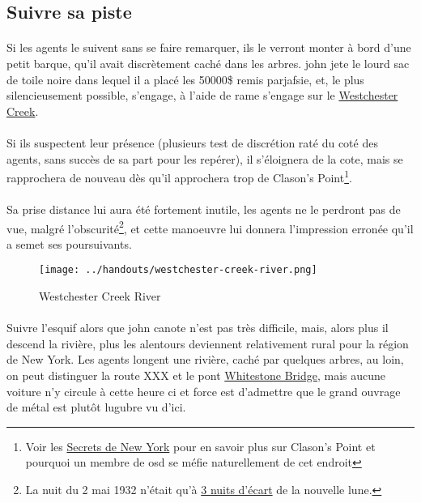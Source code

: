 \subsection{Suivre sa piste}

\paragraph{} Si les agents le suivent sans se faire remarquer, ils le verront monter à bord d'une petit barque, qu'il avait discrètement caché dans les 
arbres. \gls{john} jete le lourd sac de toile noire dans lequel il a placé les 50000\$ remis par\gls{jafsie}, et, le plus silencieusement possible, 
s'engage, à l'aide de rame s'engage sur le \href{http://en.wikipedia.org/wiki/Westchester\_Creek}{Westchester Creek}.

\paragraph{} Si ils suspectent leur présence (plusieurs test de discrétion raté du coté des agents, sans succès de sa part pour les repérer), il 
s'éloignera de la cote, mais se rapprochera de nouveau dès qu'il approchera trop de Clason's Point\footnote{Voir les 
\href{http://www.tentacules.net/index.php?id=1180}{Secrets de New York} pour en savoir plus sur Clason's Point et pourquoi un membre de \gls{osd}
se méfie naturellement de cet endroit}. 

\paragraph{} Sa prise distance lui aura été fortement inutile, les agents ne le perdront pas de vue, malgré l'obscurité\footnote{La nuit du 2 mai 1932 n'était 
qu'à \href{www.moonconnection.com/moon_phases_calendar.phtml}{3 nuits d'écart} de la nouvelle lune.}, et cette manoeuvre lui donnera l'impression erronée
qu'il a semet ses poursuivants.


\begin{wrapfigure}{r}{60mm}
\begin{center}
 \texttt{[image: ../handouts/westchester-creek-river.png]}
\end{center}
\caption{Westchester Creek River}
\end{wrapfigure}



\paragraph{} Suivre l'esquif alors que \gls{john} canote n'est pas très difficile, mais, alors plus il descend la rivière, plus les alentours deviennent 
relativement rural pour la région de New York. Les agents longent une rivière, caché par quelques arbres, au loin, on peut distinguer la route XXX
et le pont \href{http://en.wikipedia.org/wiki/Bronx–Whitestone\_Bridge}{Whitestone Bridge}, mais aucune voiture n'y circule à cette heure ci et 
force est d'admettre que le grand ouvrage de métal est plutôt lugubre vu d'ici.

